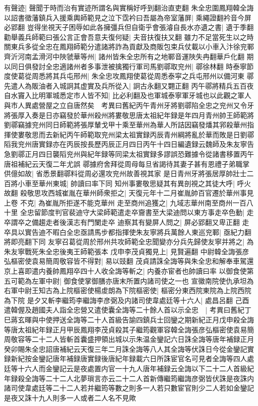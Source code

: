 有聲迹|{
	聲聞于時而治有實迹所謂名與實稱好呼到翻治直吏翻}
朱全忠圍鳳翔韓全誨以詔書徵藩鎮兵入援乘輿師範見之泣下霑衿曰吾屬為帝室藩屏|{
	乘繩證翻衿音今屏必郢翻}
豈得坐視天子困辱如此各擁彊兵但自衛乎會張濬自長水亦遺之書|{
	遺于季翻}
勸舉義兵師範曰張公言正會吾意夫復何疑|{
	夫音扶復扶又翻}
雖力不足當死生以之時關東兵多從全忠在鳳翔師範分遣諸將詐為貢獻及商販包束兵仗載以小車入汴徐兖鄆齊沂河南孟滑河中陜虢華等州|{
	諸州皆朱全忠所有之地鄆音運陜失冉翻華戶化翻}
期以同日俱發討全忠適諸州者多事泄被擒獨行軍司馬劉鄩取兖州|{
	鄩徐林翻}
時泰寧節度使葛從周悉將其兵屯邢州|{
	朱全忠攻鳳翔使葛從周悉泰寜之兵屯邢州以備河東}
鄩先遣人為販油者入城詗其虚實及兵所從入|{
	詗古永翻又翾正翻}
丙午鄩將精兵五百夜自水竇入比明軍城悉定市人皆不知|{
	比必利翻及也軍城泰寧軍牙城也以此觀之軍人與市人異處營屋之立自唐然矣　考異曰舊紀丙午青州牙將劉鄩陷全忠之兖州又令牙將張厚入奏是日亦竊發於華州殺州將婁敬思唐太祖紀年録是年四月青州帥王師範將劉鄩竊據兖州同日師範將張厚輦戈甲十乘至華州為華人所詰因竊發燔其郛殺華州指揮使婁敬思而去新紀丙午師範取兖州梁太祖實録丙辰青州綱將亂於華而敗是日劉鄩䧟我兖州唐實録亦在丙辰按長歷丙辰正月四日丙午十四日編遺録云魏師及朱友寧告急劉鄩正月四日襲䧟兖州與紀年録等同梁太祖實録多謬誤恐難據令從諸書移置丙午唐祖補紀云天復二年尤誤}
鄩據府舍拜從周母每旦省謁待其妻子甚有恩禮子弟職掌供億如故|{
	省悉景翻鄩料從周必還攻兖州故善視其家}
是日青州牙將張居厚帥壯士二百將小車至華州東城|{
	帥讀曰率下同}
知州事婁敬思疑其有異剖視之其徒大呼|{
	呼火故翻}
殺敬思攻西城崔胤在華州師衆拒之|{
	天復元年十二月崔胤帥百官遷於華州事見上卷}
不克|{
	為崔胤所拒遂不能克華州}
走至商州追獲之|{
	九域志華州南至商州一百八十里}
全忠留節度判官裴迪守大梁師範遣走卒齎書至大梁迪問以東方事走卒色動|{
	走卒謂卒之備趨走者後漢志有門闌走卒}
迪察其有變屏人問之|{
	屏必郢翻又卑正翻}
走卒具以實告迪不暇白全忠亟請馬步都指揮使朱友寧將兵萬餘人東巡兖鄆|{
	亟紀力翻將即亮翻下同}
友寧召葛從周於邢州共攻師範全忠聞變亦分兵先歸使友寧并將之|{
	為朱友寧戰死朱全忠後夷王師範張本}
戊申李茂貞獨見上|{
	見賢遍翻}
中尉韓全誨張彦弘樞密使袁易簡周敬容皆不得對|{
	易以豉翻}
茂貞請誅全誨等與朱全忠和解奉車駕還京上喜即遣内養帥鳳翔卒四十人收全誨等斬之|{
	内養亦宦者也帥讀曰率}
以御食使第五可範為左軍中尉|{
	御食使掌御膳亦唐末所置内諸司使之一也}
宣徽南院使仇承坦為右軍中尉王知古為上院樞密使楊䖍朗為下院樞密使|{
	樞密分東西院東院為上院西院為下院}
是夕又斬李繼筠李繼誨李彦弼及内諸司使韋處廷等十六人|{
	處昌呂翻}
己酉遣韓偓及趙國夫人詣全忠營又遣使囊全誨等二十餘人首以示全忠　|{
	考異曰舊紀丁巳蔣玄暉與中使押送全誨等二十人首級告諭四鎮兵士回鑾之期新紀正月戊申殺全誨等唐太祖紀年録正月甲辰鳳翔李茂貞殺其子繼筠觀軍容韓全誨張彦弘樞密使袁易簡周敬容等二十二人皆斬首囊盛押領出城以示朱温金鑾記六日誅全誨等唐年補録正月癸卯賜朱全忠詔唐補紀云天復三年二月誅全誨等八人其全誨等伏誅日今從金鑾記實録新紀按金鑾記唐年補録唐實録後唐紀年録載六日所誅宦官名可見者全誨等四人處廷等十六人而金鑾記云是夜處置内官一十九人唐年補録云全誨以下二十二人首級紀年録殺全誨等二十二人北夢瑣言亦云二十二人首新傳繼筠繼誨彦弼皆伏誅是夜誅内諸司使韋處廷等二十二人若并繼筠等數之則多一人若只數宦官則少二人若如金鑾記是夜又誅十九人則多一人或者二人名不見歟}

